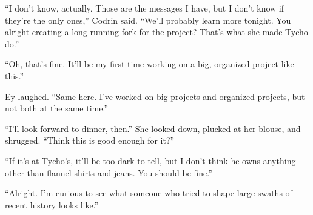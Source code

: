 ``I don't know, actually. Those are the messages I have, but I don't know if they're the only ones,'' Codrin said. ``We'll probably learn more tonight. You alright creating a long-running fork for the project? That's what she made Tycho do.''

``Oh, that's fine. It'll be my first time working on a big, organized project like this.''

Ey laughed. ``Same here. I've worked on big projects and organized projects, but not both at the same time.''

``I'll look forward to dinner, then.'' She looked down, plucked at her blouse, and shrugged. ``Think this is good enough for it?''

``If it's at Tycho's, it'll be too dark to tell, but I don't think he owns anything other than flannel shirts and jeans. You should be fine.''

``Alright. I'm curious to see what someone who tried to shape large swaths of recent history looks like.''
